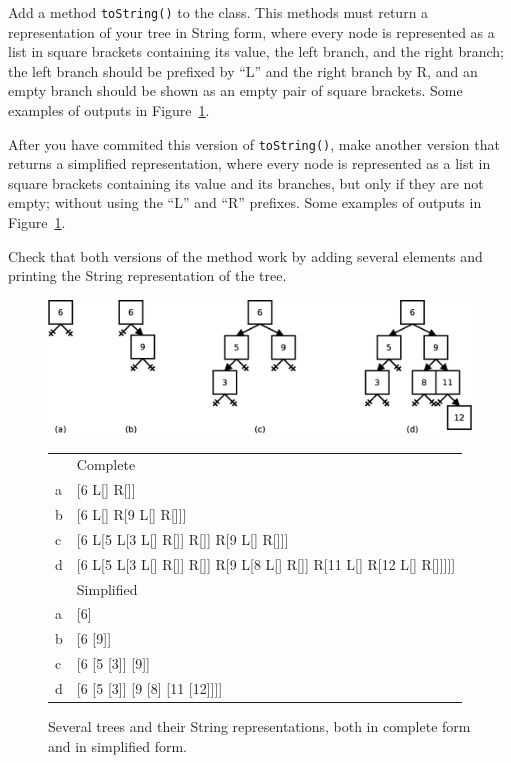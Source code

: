 \documentclass{article}
\begin{document}
Add a method \verb+toString()+ to the class. This methods must return
a representation of your tree in String form, where every node is
represented as a list in square brackets containing its value, the
left branch, and the right branch; the left branch should be prefixed
by ``L'' and the right branch by R, and an empty branch should be
shown as an empty pair of square brackets. 
Some examples of outputs in Figure~\ref{fig:jdjfj}.

After you have commited this version of \verb+toString()+, make
another version that returns a simplified representation, where every
node is represented as a list in square brackets containing its value
and its branches, but only if they are not empty; without using the
``L'' and ``R'' prefixes. 
Some examples of outputs in Figure~\ref{fig:jdjfj}.

Check that both versions of the method work by adding several elements
and printing the String representation of the tree. 

\begin{figure}[hbtp]
  \centering
  \includegraphics[width=\textwidth]{gfx/tree-toString}
  \begin{tabular}{ll}
      & Complete \\
    a & [6 L[] R[]] \\
    b & [6 L[] R[9 L[] R[]]] \\
    c & [6 L[5 L[3 L[] R[]] R[]] R[9 L[] R[]]] \\
    d & [6 L[5 L[3 L[] R[]] R[]] R[9 L[8 L[] R[]] R[11 L[] R[12 L[] R[]]]]] \\
      & Simplified \\
    a & [6] \\
    b & [6 [9]] \\
    c & [6 [5 [3]] [9]] \\
    d & [6 [5 [3]] [9 [8] [11 [12]]]] \\
  \end{tabular}
  \caption{Several trees and their String representations, both in
    complete form and in simplified form.}
  \label{fig:jdjfj}
\end{figure}
\end{document}
